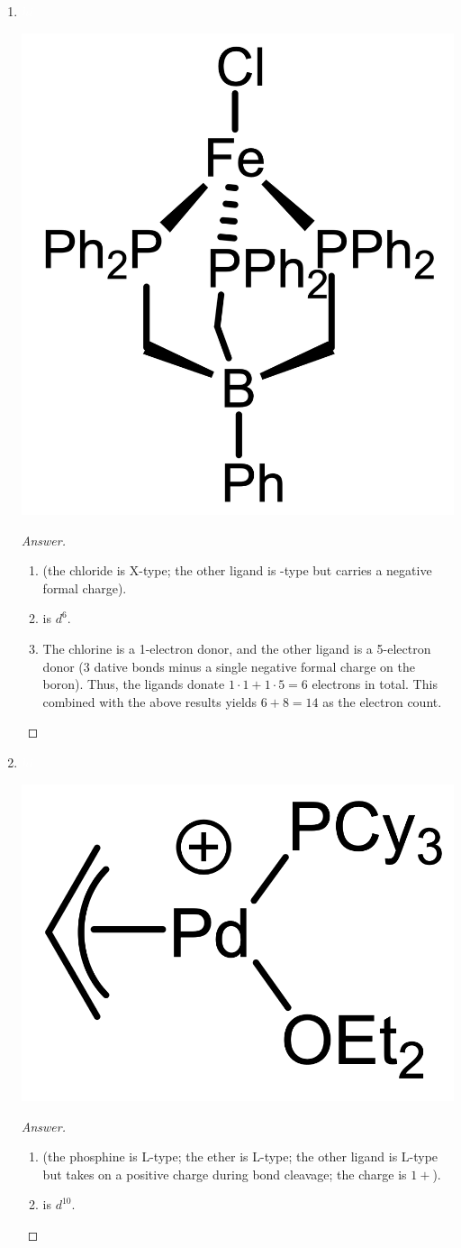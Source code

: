 \documentclass[../psets.tex]{subfiles}
\begin{document}
\begin{enumerate}
\begin{enumerate}[label={\arabic*)}]
\begin{proof}[Answer]
\begin{enumerate}[label={(\roman*)}]
            \end{enumerate}
        \end{proof}
        \item ${\color{white}hi}$
        \begin{center}
            \includegraphics[width=0.22\linewidth]{../ExtFiles/pset1-1-15.png}
        \end{center}
        \begin{proof}[Answer]\leavevmode
            \begin{enumerate}[label={(\roman*)}]
                \item {} (the chloride is X-type; the other ligand is -type but carries a negative formal charge).
                \item {} is $d^6$.
                \item The chlorine is a 1-electron donor, and the other ligand is a 5-electron donor (3 dative bonds minus a single negative formal charge on the boron). Thus, the ligands donate $1\cdot 1+1\cdot 5=6$ electrons in total. This combined with the above results yields $6+8=14$ as the electron count.
            \end{enumerate}
        \end{proof}
        \newpage
        \item ${\color{white}hi}$
        \begin{center}
            \includegraphics[width=0.18\linewidth]{../ExtFiles/pset1-1-16.png}
        \end{center}
        \begin{proof}[Answer]\leavevmode
            \begin{enumerate}[label={(\roman*)}]
                \item {} (the phosphine is L-type; the ether is L-type; the other ligand is L-type but takes on a positive charge during bond cleavage; the charge is $1+$).
                \item {} is $d^{10}$.

\end{enumerate}
\end{proof}
\end{enumerate}
\end{enumerate}
\end{document}
